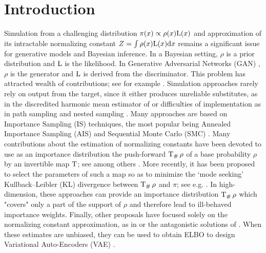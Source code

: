 \documentclass{article}
\begin{document}


\section{Introduction}
Simulation from a challenging distribution $\pi(x)\propto\rho(x)\mathrm{L}(x)$ and approximation of its intractable normalizing constant $Z=\int \rho(x) \mathrm{L}(x) \mathrm{d} x$ remains a significant issue for generative models and Bayesian inference. In a Bayesian setting, $\rho$ is a prior distribution and $\mathrm{L}$ is the likelihood. In Generative Adversarial Networks (GAN) \cite{turner:hung:2019, che:bengio:2020}, $\rho$ is the generator and $\mathrm{L}$ is derived from the discriminator.
This problem has attracted wealth of  contributions; see for example \citep{chenetal00}. Simulation approaches rarely rely on output from the target, since
it either produces unreliable substitutes, as in the discredited harmonic mean estimator of \cite{newton:raftery:1994} or difficulties of implementation as in path sampling \citep{gelman1998simulating} and nested sampling \citep{skilling2006nested,chopin:robert:2010}. Many approaches are based on Importance Sampling (IS) techniques, the most popular being Annealed Importance Sampling (AIS) \citep{neal:2001, wu:burda:grosse:2016,ding2019learning} and Sequential Monte Carlo (SMC) \citep{del2006sequential}.
Many contributions about the estimation of normalizing constants have been devoted to use as an importance distribution the push-forward $\operatorname{T}_{\#} \rho$ of a base probability $\rho$ by an invertible map $\operatorname{T}$; see among others \cite{jarzynski2002targeted,meng2002warp,neal2005hamiltonian,cuendet2006statistical,procacci2006crooks}. More recently, it has been proposed to select the parameters of such a map so as to minimize the `mode seeking' Kullback--Leibler (KL) divergence between  $\operatorname{T}_{\#}\rho$ and $\pi$; see e.g. \cite{ el2012bayesian,muller2018neural,papamakarios2019normalizing,prangle2019distilling,wirnsberger2020targeted}. In high-dimension, these approaches can provide an importance distribution $\operatorname{T}_{\#}\rho$ which "covers" only a part of the support of  $\rho$ and therefore lead to ill-behaved importance weights.
Finally, other proposals have focused solely on the normalizing constant approximation, as in \cite{chib:1995} or the antagonistic solutions of \cite{geyer:1993,gutmann:hyvarinen:2012}. When these estimates are unbiased, they can be used to obtain ELBO to design Variational Auto-Encoders (VAE) \citep{mnih2016variational}.
\end{document}
